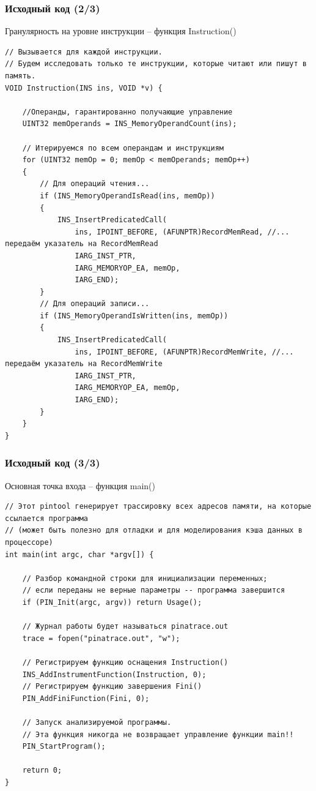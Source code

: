 \documentclass{beamer}
\begin{document}
\begin{frame}[fragile] %
\frametitle{Исходный код (2/3)}

\begin{block}{Гранулярность на уровне инструкции -- функция Instruction()}
\begin{verbatim}
// Вызывается для каждой инструкции.
// Будем исследовать только те инструкции, которые читают или пишут в память.
VOID Instruction(INS ins, VOID *v) {

    //Операнды, гарантированно получающие управление
    UINT32 memOperands = INS_MemoryOperandCount(ins);

    // Итерируемся по всем операндам и инструкциям
    for (UINT32 memOp = 0; memOp < memOperands; memOp++)
    {
        // Для операций чтения...
        if (INS_MemoryOperandIsRead(ins, memOp))
        {
            INS_InsertPredicatedCall(
                ins, IPOINT_BEFORE, (AFUNPTR)RecordMemRead, //... передаём указатель на RecordMemRead
                IARG_INST_PTR,
                IARG_MEMORYOP_EA, memOp,
                IARG_END);
        }
        // Для операций записи...
        if (INS_MemoryOperandIsWritten(ins, memOp))
        {
            INS_InsertPredicatedCall(
                ins, IPOINT_BEFORE, (AFUNPTR)RecordMemWrite, //... передаём указатель на RecordMemWrite
                IARG_INST_PTR,
                IARG_MEMORYOP_EA, memOp,
                IARG_END);
        }
    }
}
\end{verbatim}
\end{block}

\end{frame}


\begin{frame}[fragile] %
\frametitle{Исходный код (3/3)}
\begin{block}{Основная точка входа -- функция main()}
\begin{verbatim}
// Этот pintool генерирует трассировку всех адресов памяти, на которые ссылается программа
// (может быть полезно для отладки и для моделирования кэша данных в процессоре)
int main(int argc, char *argv[]) {

    // Разбор командной строки для инициализации переменных;
    // если переданы не верные параметры -- программа завершится
    if (PIN_Init(argc, argv)) return Usage();

    // Журнал работы будет называться pinatrace.out
    trace = fopen("pinatrace.out", "w");

    // Регистрируем функцию оснащения Instruction()
    INS_AddInstrumentFunction(Instruction, 0);
    // Регистрируем функцию завершения Fini()
    PIN_AddFiniFunction(Fini, 0);

    // Запуск анализируемой программы.
    // Эта функция никогда не возвращает управление функции main!!
    PIN_StartProgram();
    
    return 0;
}
\end{verbatim}
\end{block}
\end{frame}
\end{document}
